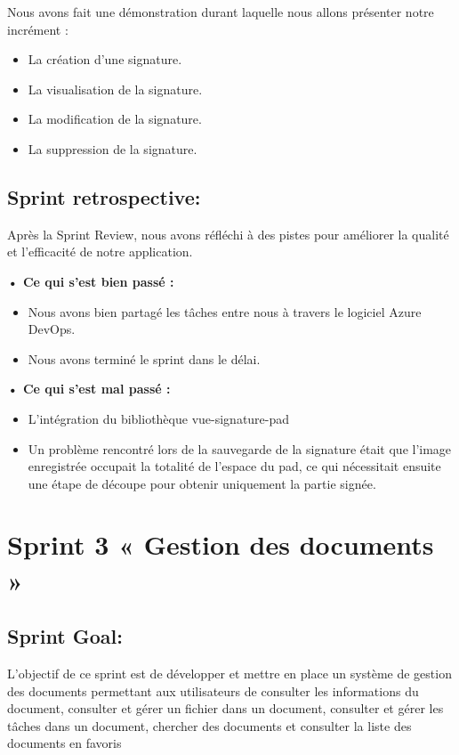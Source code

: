Nous avons fait une démonstration durant laquelle nous allons présenter notre incrément :

\begin{itemize}
  \item La création d'une signature.
  \item La visualisation de la signature.
  \item La modification de la signature.
  \item La suppression de la signature.
\end{itemize}

\subsection{Sprint retrospective:}

Après la Sprint Review, nous avons réfléchi à des pistes pour améliorer la qualité et l'efficacité de notre application.

\noindent\textbf{•	Ce qui s'est bien passé :}
\begin{itemize}
  \item Nous avons bien partagé les tâches entre nous à travers le logiciel Azure DevOps. 
  \item Nous avons terminé le sprint dans le délai.
\end{itemize}

\noindent\textbf{•	Ce qui s'est mal passé :}
\begin{itemize}
  \item L'intégration du bibliothèque vue-signature-pad
  \item Un problème rencontré lors de la sauvegarde de la signature était que l'image enregistrée occupait la totalité de l'espace du pad, ce qui nécessitait ensuite une étape de découpe pour obtenir uniquement la partie signée.
\end{itemize}

\section{Sprint 3 « Gestion des documents »}
\subsection{Sprint Goal:}

L'objectif de ce sprint est de développer et mettre en place un système de gestion des documents permettant aux utilisateurs de consulter les informations du document, consulter et gérer un fichier dans un document, consulter et gérer les tâches dans un document, chercher des documents et consulter la liste des documents en favoris

